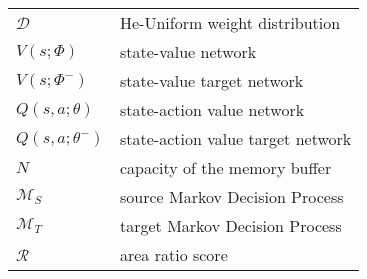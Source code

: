 \begin{tabularx}{\textwidth}{ l X }
	$\mathscr{D}$ & He-Uniform weight distribution \\
	$V(s;\Phi)$ & state-value network \\
	$V(s;\Phi^{-})$ & state-value target network \\ 
	$Q(s,a;\theta)$ & state-action value network \\ 
	$Q(s,a;\theta^{-})$ & state-action value target network \\
	$N$ & capacity of the memory buffer \\
	$\mathcal{M}_S$ & source Markov Decision Process \\ 
	$\mathcal{M}_T$ & target Markov Decision Process \\
	$\mathscr{R}$ & area ratio score \\
	
\end{tabularx}


\endgroup
